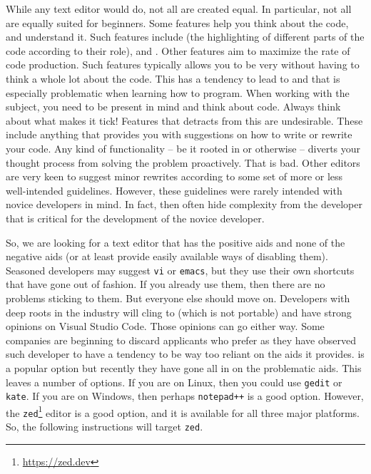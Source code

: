 While any text editor would do, not all are created equal. In particular, not all are equally suited for beginners. Some features help you think about the code, and understand it. Such features include  (the highlighting of different parts of the code according to their role),  and . Other features aim to maximize the rate of code production. Such features typically allows you to be very  without having to think a whole lot about the code. This has a tendency to lead to  and that is especially problematic when learning how to program. When working with the subject, you need to be present in mind and think about code. Always think about what makes it tick! Features that detracts from this are undesirable. These include anything that provides you with suggestions on how to write or rewrite your code. Any kind of  functionality -- be it rooted in  or otherwise -- diverts your thought process from solving the problem proactively. That is bad. Other editors are very keen to suggest minor rewrites according to some set of more or less well-intended guidelines. However, these guidelines were rarely intended with novice developers in mind. In fact, then often hide complexity from the developer that is critical for the development of the novice developer.

So, we are looking for a text editor that has the positive aids and none of the negative aids (or at least provide easily available ways of disabling them). Seasoned developers may suggest \texttt{vi} or \texttt{emacs}, but they use their own shortcuts that have gone out of fashion. If you already use them, then there are no problems sticking to them. But everyone else should move on. Developers with deep roots in the industry will cling to  (which is not portable) and have strong opinions on Visual Studio Code. Those opinions can go either way. Some companies are beginning to discard applicants who prefer  as they have observed such developer to have a tendency to be way too reliant on the aids it provides.  is a popular option but recently they have gone all in on the problematic aids. This leaves a number of options. If you are on Linux, then you could use \texttt{gedit} or \texttt{kate}. If you are on Windows, then perhaps \texttt{notepad++} is a good option. However, the \texttt{zed}\footnote{\url{https://zed.dev}} editor is a good option, and it is available for all three major platforms. So, the following instructions will target \texttt{zed}.

